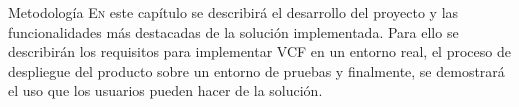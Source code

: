 \begin{chapter}{Metodología}
\label{chap:Metodologia}
\lettrine{E}{n} este capítulo se describirá el desarrollo del proyecto y las funcionalidades más destacadas de la solución implementada. Para ello se describirán los requisitos para implementar VCF en un entorno real, el proceso de despliegue del producto sobre un entorno de pruebas y finalmente, se demostrará el uso que los usuarios pueden hacer de la solución.
%
% 


%
%
\end{chapter}